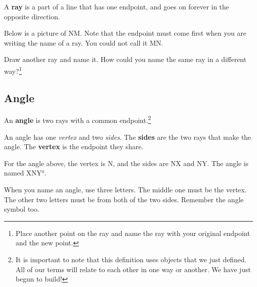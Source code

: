 A \textbf{ray} is a part of a line that has one endpoint, and goes on forever in the opposite direction.

Below is a picture of \ray NM.  Note that the endpoint must come first when you are writing the name of a ray.  You could not call it \ray MN. 

	\begin{center}
	\end{center}
	
\noindent \q Draw another ray and name it. \aq How could you name the same ray in a different way?\footnote{Place another point on the ray and name the ray with your original endpoint and the new point.}
\medskip

\subsection{Angle}
An \textbf{angle} is two rays with a common endpoint.\footnote{It is important to note that this definition uses objects that we just defined. All of our terms will relate to each other in one way or another.  We have just begun to build!}\\

\newpage

An angle has one \emph{vertex} and two \emph{sides}.
The \textbf{sides} are the two rays that make the angle. 
The \textbf{vertex} is the endpoint they share.

	\begin{center}
	\end{center}

For the angle above, the vertex is \pnt N, and the sides are \ray NX and \ray NY.  The angle is named \ang{XNY}. 

When you name an angle, use three letters.  The middle one must be the vertex.  The other two letters must be from both of the two sides.  Remember the angle symbol too.

